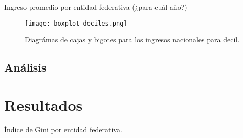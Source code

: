 \documentclass{article}
\begin{document}
\begin{table}[H]
\centering
\caption{Ingreso promedio por entidad federativa (¿para cuál año?)}
\label{table:diferenciasTasas}
\end{table}

\begin{figure}[H]
    \texttt{[image: boxplot\_deciles.png]}
    \caption{Diagrámas de cajas y bigotes para los ingresos nacionales para decil.}
    \label{fig:serieTasasVocalizaciones}
\end{figure}

\subsection*{Análisis}


\section*{Resultados}
\begin{table}[H]
\caption{Índice de Gini por entidad federativa.}
\centering
\label{table:diferenciasTasas}
\end{table}

 

\end{document}

